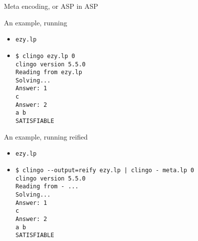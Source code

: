\begin{frame}[fragile,shrink=34]{Meta encoding, or ASP in ASP}
  \bigskip
  
\end{frame}
\begin{frame}[fragile]{An example, running}
  \begin{itemize}
  \item {} \texttt{ezy.lp}
    
  \item<2-> 
\begin{lstlisting}[basicstyle=\small\ttfamily]
$ clingo ezy.lp 0
clingo version 5.5.0
Reading from ezy.lp
Solving...
Answer: 1
c
Answer: 2
a b
SATISFIABLE
\end{lstlisting}
  \end{itemize}
\end{frame}
\begin{frame}[fragile]{An example, running reified}
  \begin{itemize}
  \item {} \texttt{ezy.lp}
    
  \item<2-> 
\begin{lstlisting}[basicstyle=\small\ttfamily]
$ clingo --output=reify ezy.lp | clingo - meta.lp 0
clingo version 5.5.0
Reading from - ...
Solving...
Answer: 1
c
Answer: 2
a b
SATISFIABLE
\end{lstlisting}
  \end{itemize}
\end{frame}
%
